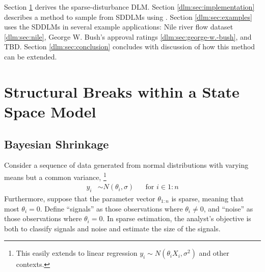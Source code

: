 Section \ref{dlm:sec:struct-breaks-state} derives the sparse-disturbance DLM.
Section \ref{dlm:sec:implementation} describes a method to sample from SDDLMs using \Stan{}.
Section \ref{dlm:sec:examples} uses the SDDLMs in several example applications: Nile river flow dataset \ref{dlm:sec:nile}, George W. Bush's approval ratings \ref{dlm:sec:george-w.-bush}, and TBD.
Section \ref{dlm:sec:conclusion} concludes with discussion of how this
method can be extended.

\section{Structural Breaks within a State Space Model}
\label{dlm:sec:struct-breaks-state}

\subsection{Bayesian Shrinkage}
\label{dlm:sec:bayesian-shrinkage}

Consider a sequence of data generated from normal distributions with varying means but a common variance,%
\footnote{
  This easily extends to linear regression $y_{i} \sim N(\theta_{i} X_{i}, \sigma^{2})$ and other contexts.
}
\begin{align}
  \label{dlm:eq:13}
  y_{i} & \sim N(\theta_{i}, \sigma) & & \text{for $i \in 1:n$}
\end{align}
Furthermore, suppose that the parameter vector $\theta_{1:n}$ is sparse, meaning that most $\theta_{i} = 0$.
Define ``signals'' as those observations where $\theta_{i} \neq 0$, and ``noise'' as those observations where $\theta_{i} = 0$.
In sparse estimation, the analyst's objective is both to classify signals and noise and estimate the size of the signals.

